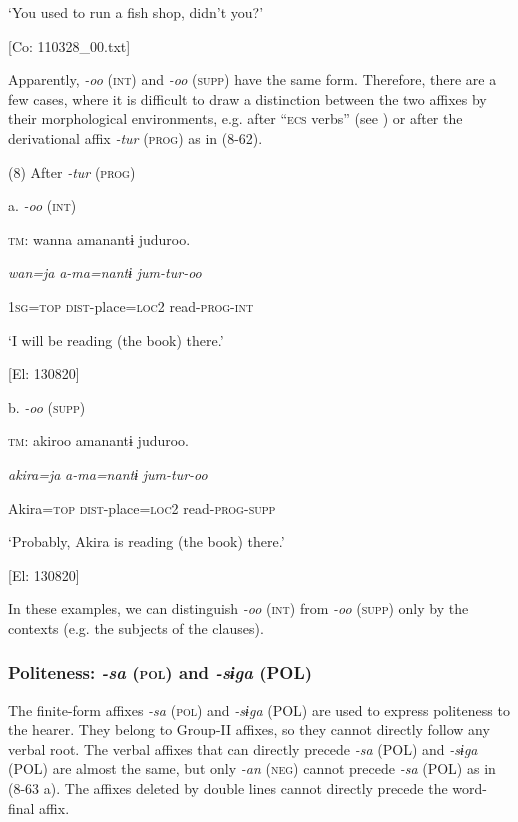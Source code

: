      ‘You used to run a fish shop, didn’t you?’

      [Co: 110328\_00.txt]

  Apparently, \textit{-oo} (\textsc{int}) and \textit{{}-oo} (\textsc{supp}) have the same form. Therefore, there are a few cases, where it is difficult to draw a distinction between the two affixes by their morphological environments, e.g. after “\textsc{ecs} verbs” (see ) or after the derivational affix \textit{{}-tur} (\textsc{prog}) as in (8-62).

(8)  After \textit{{}-tur} (\textsc{prog})

  a.  \textit{{}-oo} (\textsc{int})

    \textsc{tm}:  wanna  amanantɨ  juduroo.

      \textit{wan=ja}  \textit{a-ma=nantɨ}  \textit{jum-tur-oo}

      1\textsc{sg}=\textsc{top}  \textsc{dist}-place=\textsc{loc}2  read-\textsc{prog}-\textsc{int}

      ‘I will be reading (the book) there.’

      [El: 130820]

  b.  \textit{{}-oo} (\textsc{supp})

    \textsc{tm}:  akiroo  amanantɨ  juduroo.

      \textit{akira=ja}  \textit{a-ma=nantɨ}  \textit{jum-tur-oo}

      Akira=\textsc{top}  \textsc{dist}-place=\textsc{loc}2  read-\textsc{prog}-\textsc{supp}

      ‘Probably, Akira is reading (the book) there.’

      [El: 130820]

In these examples, we can distinguish \textit{{}-oo} (\textsc{int}) from \textit{{}-oo} (\textsc{supp}) only by the contexts (e.g. the subjects of the clauses).

\subsubsection{Politeness: \textit{{}-sa} (\textsc{pol}) and \textit{{}-sɨga} (POL)}

The finite-form affixes \textit{{}-sa} (\textsc{pol}) and \textit{{}-sɨga} (POL) are used to express politeness to the hearer. They belong to Group-II affixes, so they cannot directly follow any verbal root. The verbal affixes that can directly precede \textit{{}-sa} (POL) and \textit{{}-sɨga} (POL) are almost the same, but only \textit{{}-an} (\textsc{neg}) cannot precede \textit{{}-sa} (POL) as in (8-63 a). The affixes deleted by double lines cannot directly precede the word-final affix.

